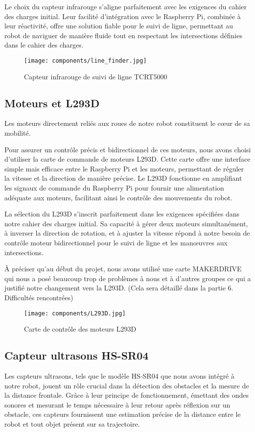 Le choix du capteur infrarouge s'aligne parfaitement avec les exigences du cahier des charges initial. Leur facilité d'intégration avec le Raspberry Pi, combinée à leur réactivité, offre une solution fiable pour le suivi de ligne, permettant au robot de naviguer de manière fluide tout en respectant les intersections définies dans le cahier des charges.

\begin{figure}[h]
    \centering
    \texttt{[image: components/line\_finder.jpg]}
    \caption{Capteur infrarouge de suivi de ligne TCRT5000}
    \label{fig:TCRT5000}
\end{figure}

\subsection{Moteurs et L293D}
Les moteurs directement reliés aux roues de notre robot constituent le cœur de sa mobilité.

Pour assurer un contrôle précis et bidirectionnel de ces moteurs, nous avons choisi d'utiliser la carte de commande de moteurs L293D. Cette carte offre une interface simple mais efficace entre le Raspberry Pi et les moteurs, permettant de réguler la vitesse et la direction de manière précise. Le L293D fonctionne en amplifiant les signaux de commande du Raspberry Pi pour fournir une alimentation adéquate aux moteurs, facilitant ainsi le contrôle des mouvements du robot.

La sélection du L293D s'inscrit parfaitement dans les exigences spécifiées dans notre cahier des charges initial. Sa capacité à gérer deux moteurs simultanément, à inverser la direction de rotation, et à ajuster la vitesse répond à notre besoin de contrôle moteur bidirectionnel pour le suivi de ligne et les manœuvres aux intersections.

À préciser qu'au début du projet, nous avons utilisé une carte MAKERDRIVE qui nous a posé beaucoup trop de problèmes à nous et à d'autres groupes ce qui a justifié notre changement vers la L293D. (Cela sera détaillé dans la partie 6. Difficultés rencontrées)

\begin{figure}[h]
    \centering
    \texttt{[image: components/L293D.jpg]}
    \caption{Carte de contrôle des moteurs L293D}
    \label{fig:L293D}
\end{figure}

\subsection{Capteur ultrasons HS-SR04}
Les capteurs ultrasons, tels que le modèle HS-SR04 que nous avons intégré à notre robot, jouent un rôle crucial dans la détection des obstacles et la mesure de la distance frontale. Grâce à leur principe de fonctionnement, émettant des ondes sonores et mesurant le temps nécessaire à leur retour après réflexion sur un obstacle, ces capteurs fournissent une estimation précise de la distance entre le robot et tout objet présent sur sa trajectoire.

